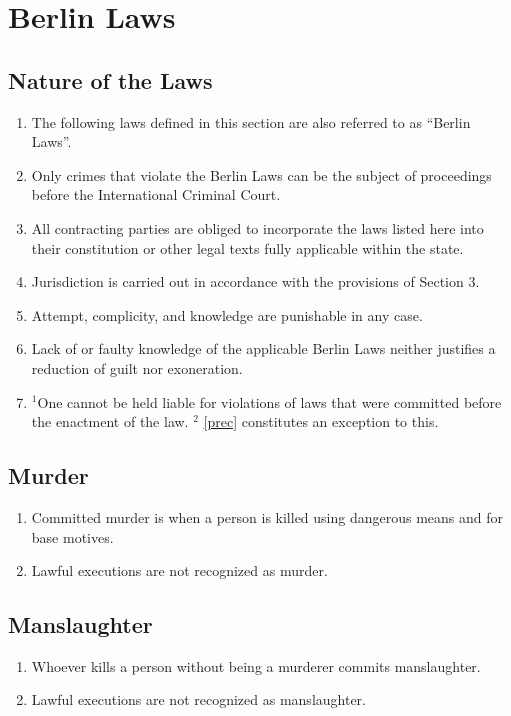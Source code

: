 \documentclass{article}
\begin{document}
\section{Berlin Laws}
\subsection{Nature of the Laws}
\begin{enumerate}[(1)]
    \item The following laws defined in this section are also referred to as ``Berlin Laws''.
    \item Only crimes that violate the Berlin Laws can be the subject of proceedings before the International Criminal Court.
    \item All contracting parties are obliged to incorporate the laws listed here into their constitution or other legal texts fully applicable within the state.
    \item Jurisdiction is carried out in accordance with the provisions of Section 3.
    \item Attempt, complicity, and knowledge are punishable in any case.
    \item Lack of or faulty knowledge of the applicable Berlin Laws neither justifies a reduction of guilt nor exoneration.
    \item ${^1}$One cannot be held liable for violations of laws that were committed before the enactment of the law. ${^2}$ \ref{prec} constitutes an exception to this.
\end{enumerate}

\subsection{Murder}
\begin{enumerate}[(1)]
    \item Committed murder is when a person is killed using dangerous means and for base motives.
    \item Lawful executions are not recognized as murder.
\end{enumerate}

\subsection{Manslaughter}
\begin{enumerate}[(1)]
    \item Whoever kills a person without being a murderer commits manslaughter.
    \item Lawful executions are not recognized as manslaughter.
\end{enumerate}
\end{document}
